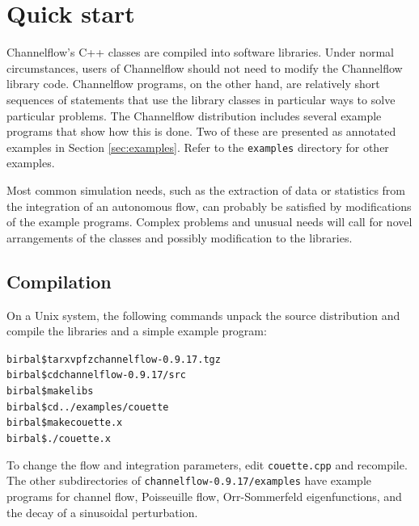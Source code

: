 \documentclass{article}[12pt]
\begin{document}
\pagebreak

\section{Quick start}

Channelflow's C++ classes are compiled into software libraries. Under
normal circumstances, users of Channelflow should not need to modify
the Channelflow library code. Channelflow programs, on the other hand,
are relatively short sequences of statements that use the library
classes in particular ways to solve particular problems. The
Channelflow distribution includes several example programs that show
how this is done. Two of these are presented as annotated examples in
Section \ref{sec:examples}. Refer to the {\tt examples} directory for
other examples.

Most common simulation needs, such as the extraction of data or
statistics from the integration of an autonomous flow, can probably be
satisfied by modifications of the example programs. Complex problems
and unusual needs will call for novel arrangements of the classes and
possibly modification to the libraries.

\subsection{Compilation}

On a Unix system, the following commands unpack the source distribution
and compile the libraries and a simple example program:
\begin{alltt}
  birbal\$ tar xvpfz channelflow-0.9.17.tgz
  birbal\$ cd channelflow-0.9.17/src
  birbal\$ make libs
  birbal\$ cd ../examples/couette
  birbal\$ make couette.x
  birbal\$ ./couette.x
\end{alltt}
To change the flow and integration parameters, edit {\tt couette.cpp}
and recompile. The other subdirectories of {\tt channelflow-0.9.17/examples}
have example programs for channel flow, Poisseuille flow, Orr-Sommerfeld
eigenfunctions, and the decay of a sinusoidal perturbation.

\end{document}
